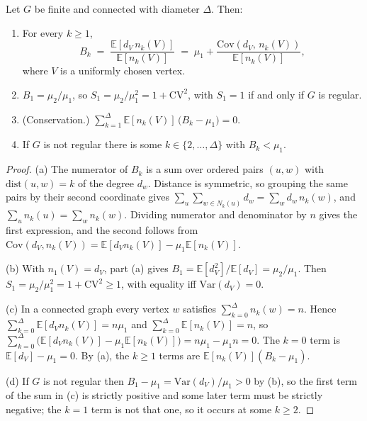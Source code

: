 \documentclass{nws}
\begin{document}
\begin{theorem}
Let $G$ be finite and connected with diameter $\Delta$. Then:
\begin{enumerate}
\item[(a)] For every $k\ge 1$,
\begin{equation*}
B_k \;=\; \frac{\mathbb{E}\!\left[d_V\, n_k(V)\right]}{\mathbb{E}\!\left[n_k(V)\right]}
\;=\; \mu_1+\frac{\mathrm{Cov}\!\left(d_V,\,n_k(V)\right)}{\mathbb{E}\!\left[n_k(V)\right]},
\end{equation*}
where $V$ is a uniformly chosen vertex.
\item[(b)] $B_1=\mu_2/\mu_1$, so $S_1=\mu_2/\mu_1^2=1+\mathrm{CV}^2$, with
$S_1=1$ if and only if $G$ is regular.
\item[(c)] (Conservation.) $\displaystyle\sum_{k=1}^{\Delta}\mathbb{E}\!\left[n_k(V)\right]\,\bigl(B_k-\mu_1\bigr)=0 .$
\item[(d)] If $G$ is not regular there is some $k\in\{2,\ldots,\Delta\}$ with
$B_k<\mu_1$.
\end{enumerate}
\end{theorem}

\begin{proof}
(a) The numerator of $B_k$ is a sum over ordered pairs $(u,w)$ with
$\mathrm{dist}(u,w)=k$ of the degree $d_w$. Distance is symmetric, so grouping
the same pairs by their second coordinate gives
$\sum_u\sum_{w\in N_k(u)}d_w=\sum_w d_w\,n_k(w)$, and
$\sum_u n_k(u)=\sum_w n_k(w)$. Dividing numerator and denominator by $n$
gives the first expression, and the second follows from
$\mathrm{Cov}(d_V,n_k(V))=\mathbb{E}[d_Vn_k(V)]-\mu_1\mathbb{E}[n_k(V)]$.

(b) With $n_1(V)=d_V$, part (a) gives
$B_1=\mathbb{E}[d_V^2]/\mathbb{E}[d_V]=\mu_2/\mu_1$. Then
$S_1=\mu_2/\mu_1^2=1+\mathrm{CV}^2\ge1$, with equality iff $\mathrm{Var}(d_V)=0$.

(c) In a connected graph every vertex $w$ satisfies $\sum_{k=0}^{\Delta}
n_k(w)=n$. Hence $\sum_{k=0}^{\Delta}\mathbb{E}[d_Vn_k(V)]=n\mu_1$ and
$\sum_{k=0}^{\Delta}\mathbb{E}[n_k(V)]=n$, so
$\sum_{k=0}^{\Delta}\bigl(\mathbb{E}[d_Vn_k(V)]-\mu_1\mathbb{E}[n_k(V)]\bigr)
=n\mu_1-\mu_1 n=0$. The $k=0$ term is $\mathbb{E}[d_V]-\mu_1=0$. By (a), the
$k\ge1$ terms are $\mathbb{E}[n_k(V)](B_k-\mu_1)$.

(d) If $G$ is not regular then $B_1-\mu_1=\mathrm{Var}(d_V)/\mu_1>0$ by (b),
so the first term of the sum in (c) is strictly positive and some later term
must be strictly negative; the $k=1$ term is not that one, so it occurs at
some $k\ge2$.
\end{proof}
\end{document}
